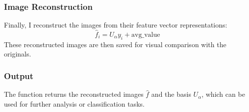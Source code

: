 \documentclass{article}
\begin{document}
   \subsubsection{Image Reconstruction}
   Finally, I reconstruct the images from their feature vector representations:
   \begin{equation}
   \hat{f}_i = U_\alpha y_i + \text{avg\_value}
   \end{equation}
   These reconstructed images are then saved for visual comparison with the originals.
   
   \subsubsection{Output}
   The function returns the reconstructed images $\hat{f}$ and the basis $U_\alpha$, which can be used for further analysis or classification tasks.
   
\end{document}
